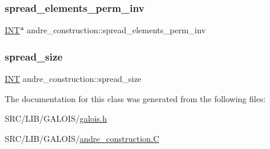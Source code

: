 \mbox{\label{classandre__construction_a320088933835d42d4d280beb8e60d4c7}} 
\subsubsection{\texorpdfstring{spread\+\_\+elements\+\_\+perm\+\_\+inv}{spread\_elements\_perm\_inv}}
{\footnotesize\ttfamily \mbox{\hyperlink{galois_8h_a09fddde158a3a20bd2dcadb609de11dc}{I\+NT}}$\ast$ andre\+\_\+construction\+::spread\+\_\+elements\+\_\+perm\+\_\+inv}

\mbox{\label{classandre__construction_a033f0cb9c8750378cc60d0bbfd696b70}} 
\subsubsection{\texorpdfstring{spread\+\_\+size}{spread\_size}}
{\footnotesize\ttfamily \mbox{\hyperlink{galois_8h_a09fddde158a3a20bd2dcadb609de11dc}{I\+NT}} andre\+\_\+construction\+::spread\+\_\+size}



The documentation for this class was generated from the following files\+:\begin{DoxyCompactItemize}
\item 
S\+R\+C/\+L\+I\+B/\+G\+A\+L\+O\+I\+S/\mbox{\hyperlink{galois_8h}{galois.\+h}}\item 
S\+R\+C/\+L\+I\+B/\+G\+A\+L\+O\+I\+S/\mbox{\hyperlink{andre__construction_8_c}{andre\+\_\+construction.\+C}}\end{DoxyCompactItemize}
